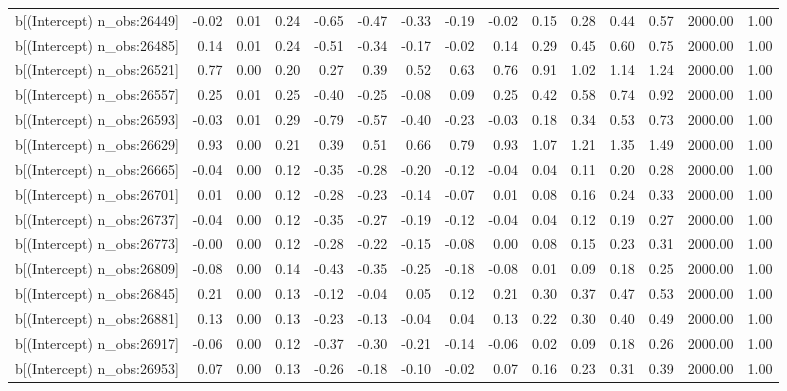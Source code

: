 \begin{table}[ht]
\begin{tabular}{rrrrrrrrrrrrrrr}
  b[(Intercept) n\_obs:26449] & -0.02 & 0.01 & 0.24 & -0.65 & -0.47 & -0.33 & -0.19 & -0.02 & 0.15 & 0.28 & 0.44 & 0.57 & 2000.00 & 1.00 \\ 
  b[(Intercept) n\_obs:26485] & 0.14 & 0.01 & 0.24 & -0.51 & -0.34 & -0.17 & -0.02 & 0.14 & 0.29 & 0.45 & 0.60 & 0.75 & 2000.00 & 1.00 \\ 
  b[(Intercept) n\_obs:26521] & 0.77 & 0.00 & 0.20 & 0.27 & 0.39 & 0.52 & 0.63 & 0.76 & 0.91 & 1.02 & 1.14 & 1.24 & 2000.00 & 1.00 \\ 
  b[(Intercept) n\_obs:26557] & 0.25 & 0.01 & 0.25 & -0.40 & -0.25 & -0.08 & 0.09 & 0.25 & 0.42 & 0.58 & 0.74 & 0.92 & 2000.00 & 1.00 \\ 
  b[(Intercept) n\_obs:26593] & -0.03 & 0.01 & 0.29 & -0.79 & -0.57 & -0.40 & -0.23 & -0.03 & 0.18 & 0.34 & 0.53 & 0.73 & 2000.00 & 1.00 \\ 
  b[(Intercept) n\_obs:26629] & 0.93 & 0.00 & 0.21 & 0.39 & 0.51 & 0.66 & 0.79 & 0.93 & 1.07 & 1.21 & 1.35 & 1.49 & 2000.00 & 1.00 \\ 
  b[(Intercept) n\_obs:26665] & -0.04 & 0.00 & 0.12 & -0.35 & -0.28 & -0.20 & -0.12 & -0.04 & 0.04 & 0.11 & 0.20 & 0.28 & 2000.00 & 1.00 \\ 
  b[(Intercept) n\_obs:26701] & 0.01 & 0.00 & 0.12 & -0.28 & -0.23 & -0.14 & -0.07 & 0.01 & 0.08 & 0.16 & 0.24 & 0.33 & 2000.00 & 1.00 \\ 
  b[(Intercept) n\_obs:26737] & -0.04 & 0.00 & 0.12 & -0.35 & -0.27 & -0.19 & -0.12 & -0.04 & 0.04 & 0.12 & 0.19 & 0.27 & 2000.00 & 1.00 \\ 
  b[(Intercept) n\_obs:26773] & -0.00 & 0.00 & 0.12 & -0.28 & -0.22 & -0.15 & -0.08 & 0.00 & 0.08 & 0.15 & 0.23 & 0.31 & 2000.00 & 1.00 \\ 
  b[(Intercept) n\_obs:26809] & -0.08 & 0.00 & 0.14 & -0.43 & -0.35 & -0.25 & -0.18 & -0.08 & 0.01 & 0.09 & 0.18 & 0.25 & 2000.00 & 1.00 \\ 
  b[(Intercept) n\_obs:26845] & 0.21 & 0.00 & 0.13 & -0.12 & -0.04 & 0.05 & 0.12 & 0.21 & 0.30 & 0.37 & 0.47 & 0.53 & 2000.00 & 1.00 \\ 
  b[(Intercept) n\_obs:26881] & 0.13 & 0.00 & 0.13 & -0.23 & -0.13 & -0.04 & 0.04 & 0.13 & 0.22 & 0.30 & 0.40 & 0.49 & 2000.00 & 1.00 \\ 
  b[(Intercept) n\_obs:26917] & -0.06 & 0.00 & 0.12 & -0.37 & -0.30 & -0.21 & -0.14 & -0.06 & 0.02 & 0.09 & 0.18 & 0.26 & 2000.00 & 1.00 \\ 
  b[(Intercept) n\_obs:26953] & 0.07 & 0.00 & 0.13 & -0.26 & -0.18 & -0.10 & -0.02 & 0.07 & 0.16 & 0.23 & 0.31 & 0.39 & 2000.00 & 1.00 \\ 

\end{tabular}
\end{table}
